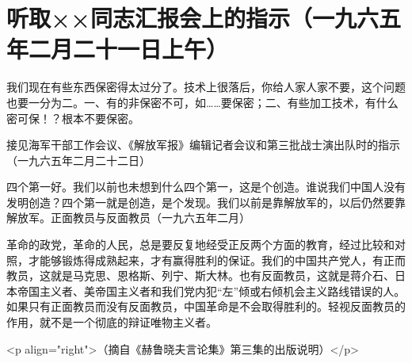 \section[听取××同志汇报会上的指示（一九六五年二月二十一日上午）]{听取××同志汇报会上的指示（一九六五年二月二十一日上午）}


我们现在有些东西保密得太过分了。技术上很落后，你给人家人家不要，这个问题也要一分为二。一、有的非保密不可，如……要保密；二、有些加工技术，有什么密可保！？根本不要保密。

接见海军干部工作会议、《解放军报》编辑记者会议和第三批战士演出队时的指示（一九六五年二月二十二日）

四个第一好。我们以前也未想到什么四个第一，这是个创造。谁说我们中国人没有发明创造？四个第一就是创造，是个发现。我们以前是靠解放军的，以后仍然要靠解放军。正面教员与反面教员（一九六五年二月）

革命的政党，革命的人民，总是要反复地经受正反两个方面的教育，经过比较和对照，才能够锻炼得成熟起来，才有赢得胜利的保证。我们的中国共产党人，有正而教员，这就是马克思、恩格斯、列宁、斯大林。也有反面教员，这就是蒋介石、日本帝国主义者、美帝国主义者和我们党内犯“左”倾或右倾机会主义路线错误的人。如果只有正面教员而没有反面教员，中国革命是不会取得胜利的。轻视反面教员的作用，就不是一个彻底的辩证唯物主义者。

<p align="right">（摘自《赫鲁晓夫言论集》第三集的出版说明）</p>


